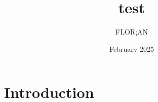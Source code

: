 \documentclass{article}
\title{test}
\author{FLOR¡AN }
\date{February 2025}
\begin{document}
\maketitle

\section{Introduction}
\end{document}
